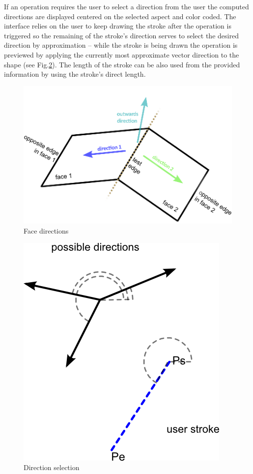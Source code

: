 If an operation requires the user to select a direction from the user the computed directions are displayed centered on the selected aspect
and color coded. The interface relies on the user to keep drawing the stroke after the operation is triggered so the remaining of the stroke's direction serves to select the desired direction by approximation -- while the stroke is being drawn the operation is previewed by applying the currently most approximate vector direction to the shape (see Fig.\ref{fig:election}).
The length of the stroke can be also used from the provided information by using the stroke's direct length.

\begin{figure}[ht]
	\centering
		\includegraphics[scale=0.6]{gfx/face-dirs.png}
	\caption{Face directions}
	\label{fig:face-dirs}
\end{figure}


\begin{figure}[ht]
	\centering
		\includegraphics[scale=0.6]{gfx/election.png}
	\caption{Direction selection}
	\label{fig:election}
\end{figure}




